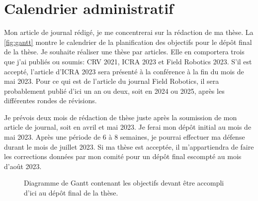\section{Calendrier administratif}
\label{sec:calendrier_admin}

Mon article de journal rédigé, je me concentrerai sur la rédaction de ma thèse.
La \autoref{fig:gantt} montre le calendrier de la planification des objectifs pour le dépôt final de la thèse.
Je souhaite réaliser une thèse par articles.
Elle en comportera trois que j'ai publiés ou soumis: CRV 2021, ICRA 2023 et Field Robotics 2023.
S'il est accepté, l'article d'ICRA 2023 sera présenté à la conférence à la fin du mois de mai 2023.
Pour ce qui est de l'article du journal Field Robotics, il sera probablement publié d'ici un an ou deux, soit en 2024 ou 2025, après les différentes rondes de révisions.

Je prévois deux mois de rédaction de thèse juste après la soumission de mon article de journal, soit en avril et mai 2023. 
Je ferai mon dépôt initial au mois de mai 2023.
Après une période de 6 à 8 semaines, je pourrai effectuer ma défense durant le mois de juillet 2023.
Si ma thèse est acceptée, il m'appartiendra de faire les corrections données par mon comité pour un dépôt final escompté au mois d'août 2023.

\setlength{\fboxsep}{9pt}
\begin{figure}[htbp]
  \centering
  
  \caption{Diagramme de Gantt contenant les objectifs devant être accompli d'ici au dépôt final de la thèse.
  }
  \label{fig:gantt}
\end{figure}
\setlength{\fboxsep}{12pt}